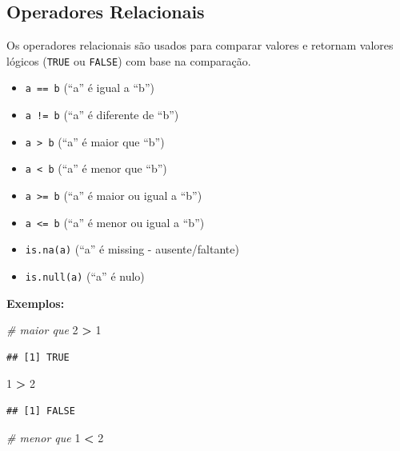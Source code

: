 \documentclass[
]{book}
\newenvironment{Shaded}{\begin{snugshade}}{\end{snugshade}}
\newcommand{\CommentTok}[1]{\textcolor[rgb]{0.56,0.35,0.01}{\textit{#1}}}
\newcommand{\DecValTok}[1]{\textcolor[rgb]{0.00,0.00,0.81}{#1}}
\newcommand{\SpecialCharTok}[1]{\textcolor[rgb]{0.81,0.36,0.00}{\textbf{#1}}}
\providecommand{\tightlist}{%
  \setlength{\itemsep}{0pt}\setlength{\parskip}{0pt}}
\theoremstyle{definition}
\theoremstyle{definition}
\theoremstyle{definition}
\theoremstyle{definition}
\theoremstyle{remark}
\begin{document}
\subsection{Operadores Relacionais}\label{operadores-relacionais}

Os operadores relacionais são usados para comparar valores e retornam valores lógicos (\texttt{TRUE} ou \texttt{FALSE}) com base na comparação.

\begin{itemize}
\tightlist
\item
  \texttt{a\ ==\ b} (``a'' é igual a ``b'')
\item
  \texttt{a\ !=\ b} (``a'' é diferente de ``b'')
\item
  \texttt{a\ \textgreater{}\ b} (``a'' é maior que ``b'')
\item
  \texttt{a\ \textless{}\ b} (``a'' é menor que ``b'')
\item
  \texttt{a\ \textgreater{}=\ b} (``a'' é maior ou igual a ``b'')
\item
  \texttt{a\ \textless{}=\ b} (``a'' é menor ou igual a ``b'')
\item
  \texttt{is.na(a)} (``a'' é missing - ausente/faltante)
\item
  \texttt{is.null(a)} (``a'' é nulo)
\end{itemize}

\textbf{Exemplos:}

\begin{Shaded}
\begin{Highlighting}[]
\CommentTok{\# maior que }
\DecValTok{2} \SpecialCharTok{\textgreater{}} \DecValTok{1}
\end{Highlighting}
\end{Shaded}

\begin{verbatim}
## [1] TRUE
\end{verbatim}

\begin{Shaded}
\begin{Highlighting}[]
\DecValTok{1} \SpecialCharTok{\textgreater{}} \DecValTok{2}
\end{Highlighting}
\end{Shaded}

\begin{verbatim}
## [1] FALSE
\end{verbatim}

\begin{Shaded}
\begin{Highlighting}[]
\CommentTok{\# menor que}
\DecValTok{1} \SpecialCharTok{\textless{}} \DecValTok{2}
\end{Highlighting}
\end{Shaded}
\end{document}
